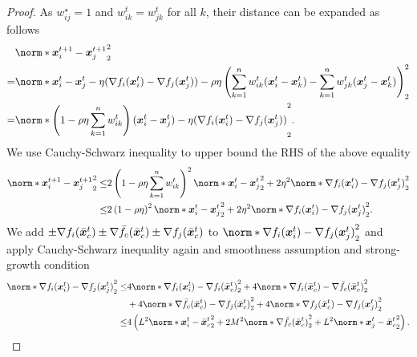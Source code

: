 \documentclass{article}
\begin{document}
\begin{proof}
  As $w^\star_{ij}=1$ and $w_{ik}^t=w_{jk}^{t}$ for all $k$, their distance can be expanded as follows
  \begin{align*}
    &\norm*{\xx_i^{t+1} - \xx_j^{t+1}}_2^2 \\
    =& \norm*{ \xx_i^t - \xx_j^t
    - \eta (\nabla f_i(\xx^t_i) - \nabla f_j(\xx^t_j)) 
      - \rho\eta\left( \sum_{k=1}^n w^t_{ik}(\xx_i^t - \xx_k^t)-\sum_{k=1}^n w^t_{jk}(\xx_j^t - \xx_k^t) \right) }_2^2 \\
    =& \norm*{ \left(1 - \rho\eta \sum_{k=1}^n w^t_{ik} \right) (\xx_i^t - \xx_j^t)
    - \eta (\nabla f_i(\xx^t_i) - \nabla f_j(\xx^t_j)) 
    }_2^2.
    \end{align*}
    We use Cauchy-Schwarz inequality to upper bound the RHS of the above equality
    \begin{equation}\label{eq:within-cluster:1}
      \begin{split}
      \norm*{\xx_i^{t+1} - \xx_j^{t+1}}_2^2 
      \le&
      2 \left(1 - \rho\eta \sum_{k=1}^n w^t_{ik} \right)^2
      \norm*{ \xx_i^t - \xx_j^t}_2^2
    + 2 \eta^2 \norm*{\nabla f_i(\xx^t_i) - \nabla f_j(\xx^t_j) }_2^2 \\
    \le&
    2 \left(1 - \rho\eta  \right)^2
    \norm*{ \xx_i^t - \xx_j^t}_2^2
    + 2 \eta^2 \norm*{\nabla f_i(\xx^t_i) - \nabla f_j(\xx^t_j) }_2^2.
  \end{split}
  \end{equation}
    We add $\pm \nabla f_i(\bar{\bm{x}}^t_c)\pm\nabla \bar{f}_c(\bar{\bm{x}}^t_c)\pm \nabla f_j(\bar{\bm{x}}^t_c)$ to $\norm*{\nabla f_i(\xx^t_i) - \nabla f_j(\xx^t_j) }_2^2$ and apply Cauchy-Schwarz inequality again
    and smoothness assumption  and strong-growth condition 
    \begin{align*}
      \norm*{\nabla f_i(\xx^t_i) - \nabla f_j(\xx^t_j) }_2^2
      \le& 4 \norm*{\nabla f_i(\xx^t_i) - \nabla f_i(\bar{\xx}^t_c) }_2^2
      + 4 \norm*{\nabla f_i(\bar{\xx}^t_c) - \nabla \bar{f}_c(\bar{\xx}^t_c) }_2^2 \\
      & + 4 \norm*{ \nabla \bar{f}_c(\bar{\xx}^t_c) - \nabla f_j(\bar{\xx}^t_c) }_2^2
      + 4 \norm*{ \nabla f_j(\bar{\xx}^t_c) - \nabla f_j(\xx^t_j) }_2^2 \\
      \le& 4 \left(L^2\norm*{\xx_i^t -\bar{\xx}_c^t }_2^2 + 2M^2 \norm*{ \nabla \bar{f}_c(\bar{\xx}^t_c) }_2^2
      + L^2\norm*{\xx_j^t -\bar{\xx}_c^t }_2^2 \right).
    \end{align*}

\end{proof}
\end{document}
